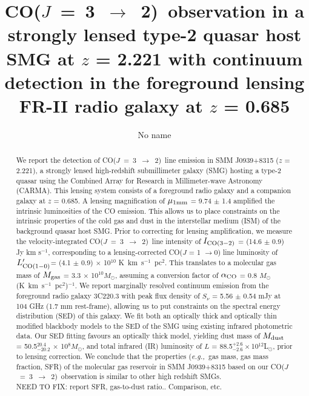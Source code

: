 \documentclass{emulateapj}
\newcommand{\Msun}{\mbox{$M_{\odot}$}}
\newcommand{\Lsun}{\mbox{L$_{\odot}$}}
\newcommand{\rarr}{$\rightarrow$}
\newcommand{\CO}{\mbox{CO($J$ = 3 $\rightarrow$ 2) }}
\newcommand{\Lp}{\mbox{$L^{\prime}_{\rm CO(1-0)}$}}
\newcommand{\LpU}{\mbox{K km s$^{-1}$ pc$^2$}}
\newcommand{\eg}{{\sl e.g.,~}}
\newcommand{\pmOne}{$^{-1}$}
\begin{document}
\title{\CO observation in a strongly lensed type-2 quasar host SMG at $z$ = 2.221 with
continuum detection in the foreground lensing FR-II radio galaxy at $z$ = 0.685}
\author{No name}

\begin{abstract}
We report the detection of \CO line emission in SMM J0939+8315 ($z$ = 2.221), a
strongly lensed high-redshift submillimeter galaxy (SMG) hosting a type-2 quasar using
the Combined Array for Research in Millimeter-wave Astronomy (CARMA). This lensing system consists of a
foreground radio galaxy and a companion galaxy at $z$ = 0.685. A lensing magnification of $\mu_{\rm 1 mm}$ = 9.74 $\pm$ 1.4 amplified the intrinsic luminosities of the CO emission. This allows us to place constraints on the intrinsic properties
of the cold gas and dust in the interstellar medium (ISM) of the background quasar host SMG. Prior to correcting for lensing 
amplification, we measure the
velocity-integrated \CO line intensity of $I_{\rm CO(3-2)}$ = (14.6 $\pm$ 0.9) Jy km s\pmOne,
corresponding to a lensing-corrected CO($J$ = 1 \rarr 0) line luminosity of \Lp = (4.1 $\pm$ 
0.9) $\times$ 10$^{10}$ \LpU. This
translates to a molecular gas mass of $M_{\rm gas}$ = 3.3 $\times$ 10$^{10}M_\odot$, assuming a conversion
factor of $\alpha_{\rm CO}$ = 0.8 \Msun (\LpU)\pmOne. We report marginally resolved continuum 
emission from the foreground radio galaxy 3C220.3 with peak flux density of $S_\nu$ = 5.56 $\pm$ 0.54 mJy
 at 104 GHz (1.7 mm rest-frame), allowing us to put constraints on the spectral energy distribution (SED) of this galaxy. We 
fit
 both an optically thick and optically thin modified blackbody models to the SED of the SMG using existing
infrared photometric data. Our SED fitting favours an optically thick model, yielding dust mass of $M_{\rm
dust}$ = 50.5$^{20.4}_{-20.2}$ $\times$ 10$^8$\Msun, and total infrared (IR) luminosity of $L$ = 88.5$^{+2.6}
_{-2.6}\times$10$^{12}$\Lsun, prior to lensing correction. We conclude that the properties (\eg gas mass, gas mass 
fraction, SFR) of the molecular gas reservoir in SMM
J0939+8315 based on our \CO observation is similar to other high redshift
SMGs. \\
NEED TO  FIX: 
report SFR, gas-to-dust ratio.. Comparison, etc. 
\end{abstract}
\end{document}
